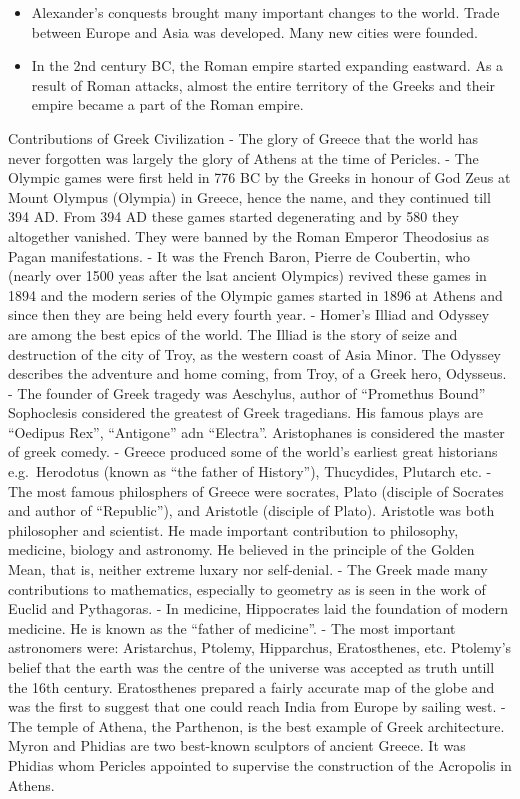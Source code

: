 \documentclass[
  openany]{book}
\begin{document}
\begin{itemize}
\item
  Alexander's conquests brought many important changes to the world. Trade between Europe and Asia was developed. Many new cities were founded.
\item
  In the 2nd century BC, the Roman empire started expanding eastward. As a result of Roman attacks, almost the entire territory of the Greeks and their empire became a part of the Roman empire.
\end{itemize}

Contributions of Greek Civilization
- The glory of Greece that the world has never forgotten was largely the glory of Athens at the time of Pericles.
- The Olympic games were first held in 776 BC by the Greeks in honour of God Zeus at Mount Olympus (Olympia) in Greece, hence the name, and they continued till 394 AD. From 394 AD these games started degenerating and by 580 they altogether vanished. They were banned by the Roman Emperor Theodosius as Pagan manifestations.
- It was the French Baron, Pierre de Coubertin, who (nearly over 1500 yeas after the lsat ancient Olympics) revived these games in 1894 and the modern series of the Olympic games started in 1896 at Athens and since then they are being held every fourth year.
- Homer's Illiad and Odyssey are among the best epics of the world. The Illiad is the story of seize and destruction of the city of Troy, as the western coast of Asia Minor. The Odyssey describes the adventure and home coming, from Troy, of a Greek hero, Odysseus.
- The founder of Greek tragedy was Aeschylus, author of ``Promethus Bound'' Sophoclesis considered the greatest of Greek tragedians. His famous plays are ``Oedipus Rex'', ``Antigone'' adn ``Electra''. Aristophanes is considered the master of greek comedy.
- Greece produced some of the world's earliest great historians e.g.~Herodotus (known as ``the father of History''), Thucydides, Plutarch etc.
- The most famous philosphers of Greece were socrates, Plato (disciple of Socrates and author of ``Republic''), and Aristotle (disciple of Plato). Aristotle was both philosopher and scientist. He made important contribution to philosophy, medicine, biology and astronomy. He believed in the principle of the Golden Mean, that is, neither extreme luxary nor self-denial.
- The Greek made many contributions to mathematics, especially to geometry as is seen in the work of Euclid and Pythagoras.
- In medicine, Hippocrates laid the foundation of modern medicine. He is known as the ``father of medicine''.
- The most important astronomers were: Aristarchus, Ptolemy, Hipparchus, Eratosthenes, etc. Ptolemy's belief that the earth was the centre of the universe was accepted as truth untill the 16th century. Eratosthenes prepared a fairly accurate map of the globe and was the first to suggest that one could reach India from Europe by sailing west.
- The temple of Athena, the Parthenon, is the best example of Greek architecture. Myron and Phidias are two best-known sculptors of ancient Greece. It was Phidias whom Pericles appointed to supervise the construction of the Acropolis in Athens.
\end{document}
